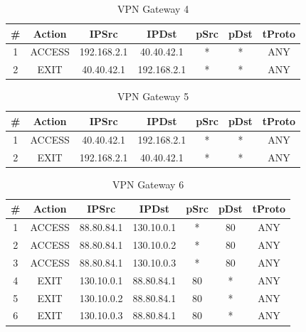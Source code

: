 \begin{table}[H]
    \centering
    \begin{tabular}{ccccccc}
        \hline
         \# & Action & IPSrc & IPDst & pSrc & pDst & tProto \\
        \hline
        1 & ACCESS & 192.168.2.1 & 40.40.42.1 & * & * & ANY \\
        2 & EXIT & 40.40.42.1 & 192.168.2.1 & * & * & ANY \\
        \hline
    \end{tabular}
    \caption{VPN Gateway 4}
    \label{tab:VPN Gateway 4}
\end{table}

\begin{table}[H]
    \centering
    \begin{tabular}{ccccccc}
        \hline
         \# & Action & IPSrc & IPDst & pSrc & pDst & tProto \\
        \hline
        1 & ACCESS & 40.40.42.1 & 192.168.2.1 & * & * & ANY \\
        2 & EXIT & 192.168.2.1 & 40.40.42.1 & * & * & ANY \\
        \hline
    \end{tabular}
    \caption{VPN Gateway 5}
    \label{tab:VPN Gateway 5}
\end{table}

\begin{table}[H]
    \centering
    \begin{tabular}{ccccccc}
        \hline
         \# & Action & IPSrc & IPDst & pSrc & pDst & tProto \\
        \hline
        1 & ACCESS & 88.80.84.1 & 130.10.0.1 & * & 80 & ANY \\
        2 & ACCESS & 88.80.84.1 & 130.10.0.2 & * & 80 & ANY \\
        3 & ACCESS & 88.80.84.1 & 130.10.0.3 & * & 80 & ANY \\
        4 & EXIT & 130.10.0.1 & 88.80.84.1 & 80 & * & ANY \\
        5 & EXIT & 130.10.0.2 & 88.80.84.1 & 80 & * & ANY \\
        6 & EXIT & 130.10.0.3 & 88.80.84.1 & 80 & * & ANY \\
        \hline
    \end{tabular}
    \caption{VPN Gateway 6}
    \label{tab:VPN Gateway 6}
\end{table}
